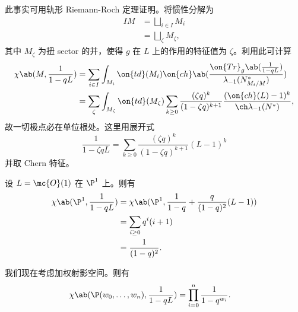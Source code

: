 此事实可用轨形 Riemann-Roch 定理证明。将惯性分解为
\begin{align*}
    IM &= \bigsqcup_{i \in I} M_i \\
    &= \bigsqcup_{\zeta} M_{\zeta},
\end{align*}
其中 \(M_{\zeta}\) 为扭 sector 的并，使得 \(g\) 在 \(L\) 上的作用的特征值为 \(\zeta\)。利用此可计算
\begin{align*}
    \chi\ab(M, \frac{1}{1-qL}) &= \sum_{i \in I} \int_{M_i} \on{td}(M_i) \on{ch} \ab(\frac{ \on{Tr}_g \ab(\frac{1}{1-qL}) }{\lambda_{-1}(N_{M_i/M}^*)}) \\
    &= \sum_{\zeta} \int_{M_{\zeta}} \on{td}(M_{\zeta}) \sum_{k \geq 0} \frac{(\zeta q)^k}{(1-\zeta q)^{k+1}} \frac{( \on{ch}(L)-1 )^k}{\ch \lambda_{-1}(N^*)},
\end{align*}
故一切极点必在单位根处。这里用展开式
\[ \frac{1}{1-\zeta q L} = \sum_{k \geq 0} \frac{(\zeta q)^k}{(1-\zeta q)^{k+1}} (L-1)^k \]
并取 Chern 特征。

\begin{exm}
    设 \(L = \mc{O}(1)\) 在 \(\P^1\) 上。则有
    \begin{align*}
        \chi\ab(\P^1, \frac{1}{1-qL}) &= \chi\ab(\P^1, \frac{1}{1-q} + \frac{q}{(1-q)^2}(L-1)) \\
        &= \sum_{i \geq 0} q^i (i+1) \\
        &= \frac{1}{(1-q)^2}.
    \end{align*}
\end{exm}

\begin{exm}
    我们现在考虑加权射影空间。则有
    \begin{align*}
        \chi\ab(\P(w_0, \ldots, w_n), \frac{1}{1-qL}) &= \prod_{i=0}^n \frac{1}{1-q^{w_i}}.
    \end{align*}
\end{exm}
